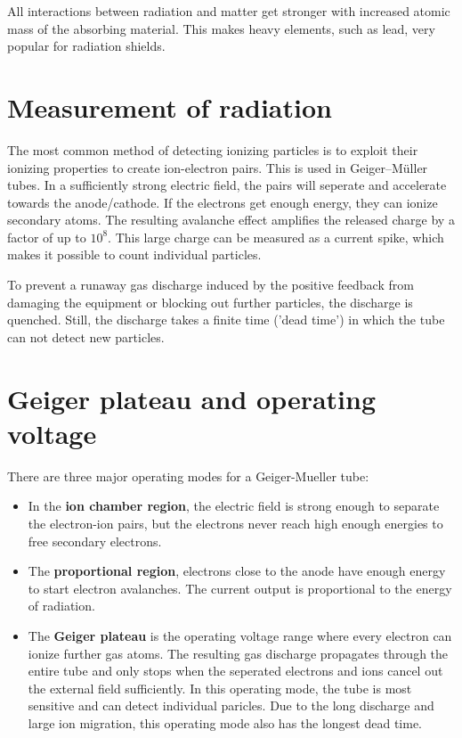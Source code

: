 All interactions between radiation and matter get stronger with increased atomic mass of the absorbing material.
This makes heavy elements, such as lead, very popular for radiation shields.

\section{Measurement of radiation}
The most common method of detecting ionizing particles is to exploit their ionizing properties to create ion-electron pairs.
This is used in Geiger–Müller tubes.
In a sufficiently strong electric field, the pairs will seperate and accelerate towards the anode/cathode.
If the electrons get enough energy, they can ionize secondary atoms.
The resulting avalanche effect amplifies the released charge by a factor of up to $10^8$.
This large charge can be measured as a current spike, which makes it possible to count individual particles.

To prevent a runaway gas discharge induced by the positive feedback from damaging the equipment or blocking out further particles, the discharge is quenched.
Still, the discharge takes a finite time ('dead time') in which the tube can not detect new particles.

\section{Geiger plateau and operating voltage}
There are three major operating modes for a Geiger-Mueller tube:
\begin{itemize}
	\item In the \textbf{ion chamber region}, the electric field is strong enough to separate the electron-ion pairs, but the electrons never reach high enough energies to free secondary electrons.
	\item The \textbf{proportional region}, electrons close to the anode have enough energy to start electron avalanches. The current output is proportional to the energy of radiation.
	\item The \textbf{Geiger plateau} is the operating voltage range where every electron can ionize further gas atoms.
	The resulting gas discharge propagates through the entire tube and only stops when the seperated electrons and ions cancel out the external field sufficiently.
	In this operating mode, the tube is most sensitive and can detect individual paricles.
	Due to the long discharge and large ion migration, this operating mode also has the longest dead time.
\end{itemize}
